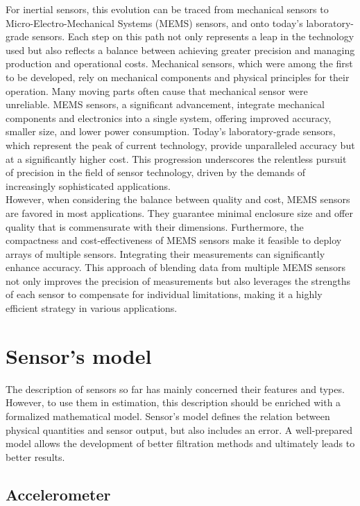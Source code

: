 For inertial sensors, this evolution can be traced from mechanical sensors to Micro-Electro-Mechanical Systems (MEMS) sensors, and onto today’s laboratory-grade sensors. Each step on this path not only represents a leap in the technology used but also reflects a balance between achieving greater precision and managing production and operational costs. Mechanical sensors, which were among the first to be developed, rely on mechanical components and physical principles for their operation. Many moving parts often cause that mechanical sensor were unreliable. MEMS sensors, a significant advancement, integrate mechanical components and electronics into a single system, offering improved accuracy, smaller size, and lower power consumption. Today's laboratory-grade sensors, which represent the peak of current technology, provide unparalleled accuracy but at a significantly higher cost. This progression underscores the relentless pursuit of precision in the field of sensor technology, driven by the demands of increasingly sophisticated applications.\\

However, when considering the balance between quality and cost, MEMS sensors are favored in most applications. They guarantee minimal enclosure size and offer quality that is commensurate with their dimensions. Furthermore, the compactness and cost-effectiveness of MEMS sensors make it feasible to deploy arrays of multiple sensors. Integrating their measurements can significantly enhance accuracy. This approach of blending data from multiple MEMS sensors not only improves the precision of measurements but also leverages the strengths of each sensor to compensate for individual limitations, making it a highly efficient strategy in various applications.

\section{Sensor's model}

The description of sensors so far has mainly concerned their features and types. However, to use them in estimation, this description should be enriched with a formalized mathematical model. Sensor's model defines the relation between physical quantities and sensor output, but also includes an error. A well-prepared model allows the development of better filtration methods and ultimately leads to better results.

\subsection{Accelerometer}

